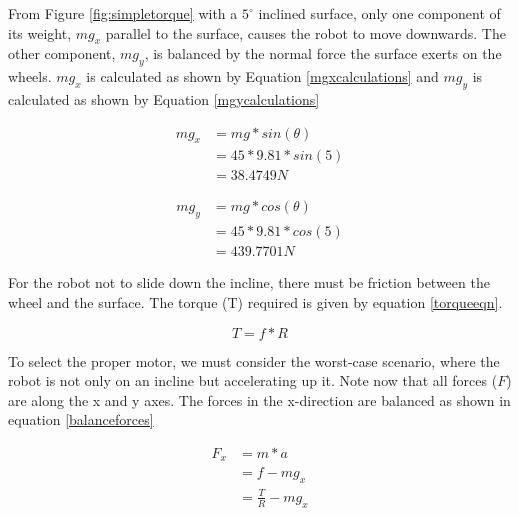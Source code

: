 From Figure \ref{fig:simpletorque} with a $5^{\circ}$ inclined surface, only one component of its weight, $mg_x$ parallel to the surface, causes the robot to move downwards. The other component, $mg_y$, is balanced by the normal force the surface exerts on the wheels. $mg_x$ is calculated as shown by Equation \ref{mgxcalculations} and $mg_y$ is calculated as shown by Equation \ref{mgycalculations}


\begin{equation} \label{mgxcalculations}
\begin{split}
mg_x & = mg * sin (\theta) \\
& = 45 * 9.81 * sin (5) \\
& = 38.4749 N 
\end{split}
\end{equation}

\begin{equation} \label{mgycalculations}
\begin{split}
mg_y & = mg * cos (\theta) \\
& = 45 * 9.81 * cos (5) \\
& = 439.7701 N
\end{split}
\end{equation}


For the robot not to slide down the incline, there must be friction between the wheel and the surface. 
The torque (T) required is given by equation \ref{torqueeqn}.

\begin{equation} \label{torqueeqn}
T = f * R
\end{equation}

To select the proper motor, we must consider the worst-case scenario, where the robot is not only on an incline but accelerating up it.
Note now that all forces ($F$) are along the x and y axes. The forces in the x-direction are balanced as shown in equation \ref{balanceforces}

\begin{equation} \label{balanceforces}
\begin{split}
F_x & = m * a  \\
& = f - m g_x \\
& = \frac{T}{R} - m g_x
\end{split}
\end{equation}



